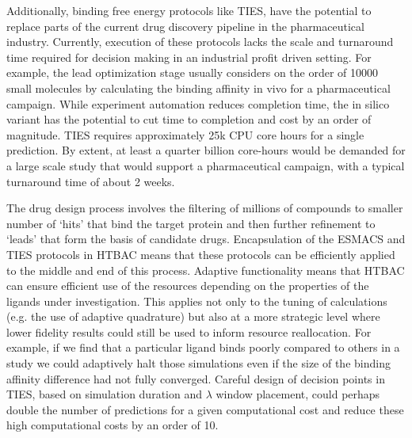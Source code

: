 \documentclass[conference]{IEEEtran}
\begin{document}
Additionally, binding free energy protocols like TIES, have the potential to 
replace parts of the current drug discovery pipeline in the pharmaceutical 
industry. Currently, execution of these protocols lacks the scale and turnaround 
time required for decision making in an industrial profit driven setting. 
For example, the lead optimization stage usually considers on the order of 10000 
small molecules by calculating the binding affinity in vivo for a pharmaceutical 
campaign. While experiment automation reduces completion time, the in silico 
variant has the potential to cut time to completion and cost by an order of 
magnitude. TIES requires approximately 25k CPU core hours for a single prediction. 
By extent, at least a quarter billion core-hours would be demanded for a large 
scale study that would support a pharmaceutical campaign, with a typical 
turnaround time of about 2 weeks. 


The drug design process involves the filtering of millions of compounds to  
smaller number of `hits' that bind the target protein and then further  
refinement to `leads' that form the basis of candidate drugs. Encapsulation of 
the ESMACS and TIES protocols in HTBAC means that these protocols can be 
efficiently applied to the middle and end of this process. Adaptive 
functionality means that HTBAC can ensure efficient use of the resources 
depending on the properties of the ligands under investigation. This applies 
not only to the tuning of calculations (e.g. the use of adaptive quadrature) 
but also at a more strategic level where lower fidelity results could still be 
used to inform resource reallocation. For example, if we find that a particular 
ligand binds poorly compared to others in a study we could adaptively halt those 
simulations even if the size of the binding affinity difference had not fully 
converged. Careful design of decision points in TIES, based on simulation 
duration and $\lambda$ window placement, could perhaps double the number of 
predictions for a given computational cost and reduce these high computational 
costs by an order of 10. 





\end{document}
